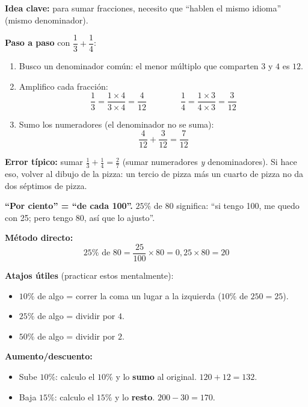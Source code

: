 \documentclass[11pt,a4paper]{article}
\begin{document}
\begin{tcolorbox}[guia-tutor, title={\color{tutormorado} SI NO SABE SUMAR FRACCIONES CON DISTINTO DENOMINADOR}]
\textbf{Idea clave:} para sumar fracciones, necesito que ``hablen el mismo idioma'' (mismo denominador).

\textbf{Paso a paso} con $\dfrac{1}{3} + \dfrac{1}{4}$:
\begin{enumerate}[nosep]
  \item Busco un denominador común: el menor múltiplo que comparten $3$ y $4$ es $12$.
  \item Amplifico cada fracción:
  \[
    \frac{1}{3} = \frac{1 \times 4}{3 \times 4} = \frac{4}{12} \qquad\qquad \frac{1}{4} = \frac{1 \times 3}{4 \times 3} = \frac{3}{12}
  \]
  \item Sumo los numeradores (el denominador no se suma):
  \[
    \frac{4}{12} + \frac{3}{12} = \frac{7}{12}
  \]
\end{enumerate}
\textbf{Error típico:} sumar $\frac{1}{3} + \frac{1}{4} = \frac{2}{7}$ (sumar numeradores \emph{y} denominadores). Si hace eso, volver al dibujo de la pizza: un tercio de pizza más un cuarto de pizza no da dos séptimos de pizza.
\end{tcolorbox}

\begin{tcolorbox}[guia-tutor, title={\color{tutormorado} SI NO ENTIENDE PORCENTAJE}]
\textbf{``Por ciento'' = ``de cada 100''.} $25\%$ de $80$ significa: ``si tengo 100, me quedo con 25; pero tengo 80, así que lo ajusto''.

\textbf{Método directo:}
\[
  25\% \text{ de } 80 = \frac{25}{100} \times 80 = 0{,}25 \times 80 = 20
\]

\textbf{Atajos útiles} (practicar estos mentalmente):
\begin{itemize}[nosep]
  \item $10\%$ de algo = correr la coma un lugar a la izquierda ($10\%$ de $250 = 25$).
  \item $25\%$ de algo = dividir por $4$.
  \item $50\%$ de algo = dividir por $2$.
\end{itemize}

\textbf{Aumento/descuento:}
\begin{itemize}[nosep]
  \item Sube $10\%$: calculo el $10\%$ y lo \textbf{sumo} al original. $120 + 12 = 132$.
  \item Baja $15\%$: calculo el $15\%$ y lo \textbf{resto}. $200 - 30 = 170$.
\end{itemize}
\end{tcolorbox}
\end{document}
